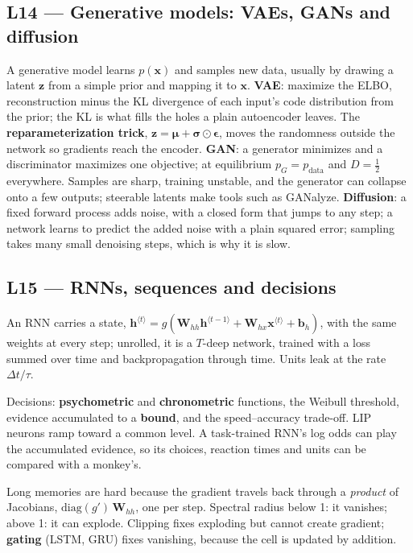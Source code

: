 \documentclass[11pt]{article}
\begin{document}
\subsection{L14 --- Generative models: VAEs, GANs and diffusion}

A generative model learns $p(\mathbf{x})$ and samples new data, usually by
drawing a latent $\mathbf{z}$ from a simple prior and mapping it to $\mathbf{x}$.
\textbf{VAE}: maximize the ELBO, reconstruction minus the KL divergence of each
input's code distribution from the prior; the KL is what fills the holes a plain
autoencoder leaves. The \textbf{reparameterization trick},
$\mathbf{z}=\boldsymbol{\mu}+\boldsymbol{\sigma}\odot\boldsymbol{\epsilon}$, moves
the randomness outside the network so gradients reach the encoder.
\textbf{GAN}: a generator minimizes and a discriminator maximizes one objective;
at equilibrium $p_G=p_{\text{data}}$ and $D=\tfrac12$ everywhere. Samples are
sharp, training unstable, and the generator can collapse onto a few outputs;
steerable latents make tools such as GANalyze. \textbf{Diffusion}: a fixed forward
process adds noise, with a closed form that jumps to any step; a network learns
to predict the added noise with a plain squared error; sampling takes many small
denoising steps, which is why it is slow.

\subsection{L15 --- RNNs, sequences and decisions}

An RNN carries a state,
$\mathbf{h}^{\langle t\rangle}=g(\mathbf{W}_{hh}\mathbf{h}^{\langle t-1\rangle}+\mathbf{W}_{hx}\mathbf{x}^{\langle t\rangle}+\mathbf{b}_h)$,
with the same weights at every step; unrolled, it is a $T$-deep network, trained
with a loss summed over time and backpropagation through time. Units leak at the
rate $\Delta t/\tau$.

Decisions: \textbf{psychometric} and \textbf{chronometric} functions, the Weibull
threshold, evidence accumulated to a \textbf{bound}, and the speed--accuracy
trade-off. LIP neurons ramp toward a common level. A task-trained RNN's log odds
can play the accumulated evidence, so its choices, reaction times and units can
be compared with a monkey's.

Long memories are hard because the gradient travels back through a
\emph{product} of Jacobians, $\mathrm{diag}(g')\,\mathbf{W}_{hh}$, one per step.
Spectral radius below 1: it vanishes; above 1: it can explode. Clipping fixes
exploding but cannot create gradient; \textbf{gating} (LSTM, GRU) fixes vanishing,
because the cell is updated by addition.
\end{document}
